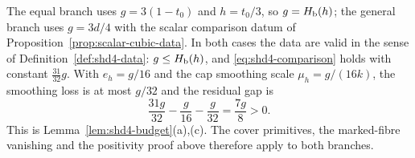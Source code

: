 \begin{remark}\label{rem:fer-lean}
The equal branch uses $g=3(1-t_0)$ and $h=t_0/3$, so $g=H_{\mathrm b}(h)$; the general branch uses $g=3d/4$ with the scalar
comparison datum of Proposition~\ref{prop:scalar-cubic-data}. In both cases the data are valid in the sense of
Definition~\ref{def:shd4-data}: $g\le H_{\mathrm b}(h)$, and \eqref{eq:shd4-comparison} holds with constant $\frac{31}{32}g$. With
$e_h=g/16$ and the cap smoothing scale $\mu_h=g/(16k)$, the smoothing loss is at most $g/32$ and the residual gap is
\[
 \frac{31g}{32}-\frac g{16}-\frac g{32}=\frac{7g}{8}>0.
\]
This is Lemma~\ref{lem:shd4-budget}(a),(c). The cover primitives, the marked-fibre vanishing and the positivity proof
above therefore apply to both branches.
\end{remark}
